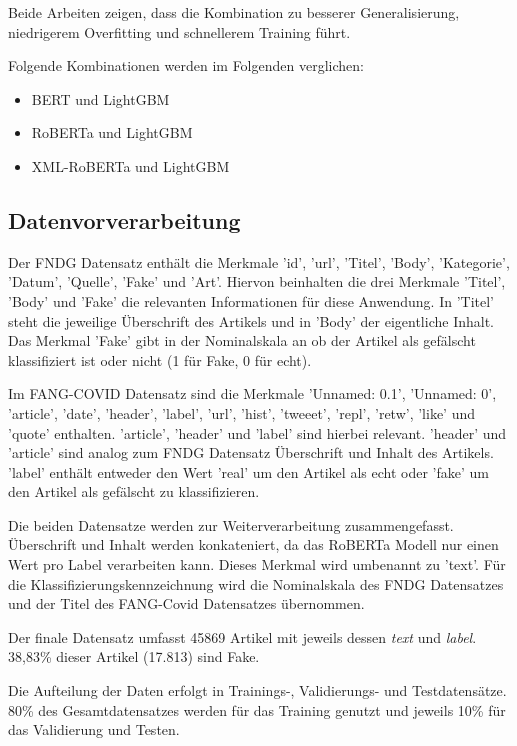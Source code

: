 Beide Arbeiten zeigen, dass die Kombination zu besserer Generalisierung, niedrigerem Overfitting und schnellerem Training führt.

Folgende Kombinationen werden im Folgenden verglichen:
\begin{itemize}
    \item BERT und LightGBM
    \item RoBERTa und LightGBM
    \item XML-RoBERTa und LightGBM
\end{itemize}

\subsection{Datenvorverarbeitung} \label{sec6:datenvorverarbeitung}

Der FNDG Datensatz enthält die Merkmale 'id', 'url', 'Titel', 'Body', 'Kategorie', 'Datum', 'Quelle', 'Fake' und 'Art'.
Hiervon beinhalten die drei Merkmale 'Titel', 'Body' und 'Fake' die relevanten Informationen für diese Anwendung.
In 'Titel' steht die jeweilige Überschrift des Artikels und in 'Body' der eigentliche Inhalt. Das Merkmal 'Fake' gibt in der Nominalskala
an ob der Artikel als gefälscht klassifiziert ist oder nicht (1 für Fake, 0 für echt).

Im FANG-COVID Datensatz sind die Merkmale 'Unnamed: 0.1', 'Unnamed: 0', 'article', 'date', 'header', 'label', 'url', 'hist', 'tweeet', 'repl', 'retw', 'like' und 'quote'
enthalten. 'article', 'header' und 'label' sind hierbei relevant. 'header' und 'article' sind analog zum FNDG Datensatz Überschrift und Inhalt
des Artikels. 'label' enthält entweder den Wert 'real' um den Artikel als echt oder 'fake' um den Artikel als gefälscht zu klassifizieren.

Die beiden Datensatze werden zur Weiterverarbeitung zusammengefasst. Überschrift und Inhalt werden konkateniert, da das RoBERTa Modell nur
einen Wert pro Label verarbeiten kann. Dieses Merkmal wird umbenannt zu 'text'. 
Für die Klassifizierungskennzeichnung wird die Nominalskala des FNDG Datensatzes und der Titel des FANG-Covid Datensatzes übernommen.

Der finale Datensatz umfasst 45869 Artikel mit jeweils dessen \textit{text} und \textit{label}.
38,83\% dieser Artikel (17.813) sind Fake. 

Die Aufteilung der Daten erfolgt in Trainings-, Validierungs- und Testdatensätze. 
80\% des Gesamtdatensatzes werden für das Training genutzt und jeweils 10\% für das Validierung und Testen.

